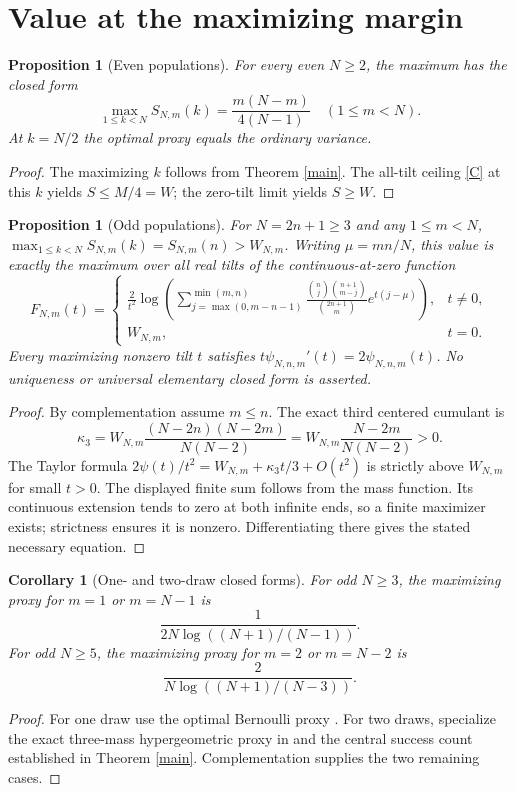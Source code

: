 \documentclass[11pt]{article}
\numberwithin{equation}{section}
\newtheorem{proposition}[theorem]{Proposition}
\newtheorem{corollary}[theorem]{Corollary}
\theoremstyle{remark}\newtheorem{remark}[theorem]{Remark}
\begin{document}
\section{Value at the maximizing margin}
\begin{proposition}[Even populations]\label{even}
For every even $N\ge2$, the maximum has the closed form
\[
\max_{1\le k<N} S_{N,m}(k)=\frac{m(N-m)}{4(N-1)}
\quad(1\le m<N).
\]
At $k=N/2$ the optimal proxy equals the ordinary variance.
\end{proposition}
\begin{proof}
The maximizing $k$ follows from Theorem \ref{main}.
The all-tilt ceiling \eqref{C} at this $k$ yields
$S\le M/4=W$; the zero-tilt limit yields $S\ge W$.
\end{proof}

\begin{proposition}[Odd populations]\label{odd}
For $N=2n+1\ge3$ and any $1\le m<N$,
$\max_{1\le k<N}S_{N,m}(k)=S_{N,m}(n)>W_{N,m}$.
Writing $\mu=mn/N$, this value is exactly the maximum
over all real tilts of the continuous-at-zero function
\[
F_{N,m}(t)=
\begin{cases}
\displaystyle\frac{2}{t^2}\log\!
\left(\sum_{j=\max(0,m-n-1)}^{\min(m,n)}
\frac{\binom{n}{j}\binom{n+1}{m-j}}{\binom{2n+1}{m}}
e^{t(j-\mu)}\right),&t\ne0,\\[10pt]
W_{N,m},&t=0.
\end{cases}
\]
Every maximizing nonzero tilt $t$ satisfies
$t\psi_{N,n,m}'(t)=2\psi_{N,n,m}(t)$.
No uniqueness or universal elementary closed form is asserted.
\end{proposition}
\begin{proof}
By complementation assume $m\le n$. The exact third
centered cumulant is
\[
\kappa_3=
W_{N,m}\frac{(N-2n)(N-2m)}{N(N-2)}
=W_{N,m}\frac{N-2m}{N(N-2)}>0.
\]
The Taylor formula
$2\psi(t)/t^2=W_{N,m}+\kappa_3t/3+O(t^2)$
is strictly above $W_{N,m}$ for small $t>0$.
The displayed finite sum follows from the mass function.
Its continuous extension tends to zero at both infinite ends,
so a finite maximizer exists; strictness ensures it is nonzero.
Differentiating there gives the stated necessary equation.
\end{proof}

\begin{corollary}[One- and two-draw closed forms]\label{small}
For odd $N\ge3$, the maximizing proxy for $m=1$ or $m=N-1$ is
\[
\frac1{2N\log((N+1)/(N-1))}.
\]
For odd $N\ge5$, the maximizing proxy for $m=2$ or $m=N-2$ is
\[
\frac2{N\log((N+1)/(N-3))}.
\]
\end{corollary}
\begin{proof}
For one draw use the optimal Bernoulli proxy
\cite{Arbel}. For two draws, specialize the exact three-mass
hypergeometric proxy in \cite{Wang,ThreeMass} and the
central success count established in Theorem \ref{main}.
Complementation supplies the two remaining cases.
\end{proof}
\end{document}
